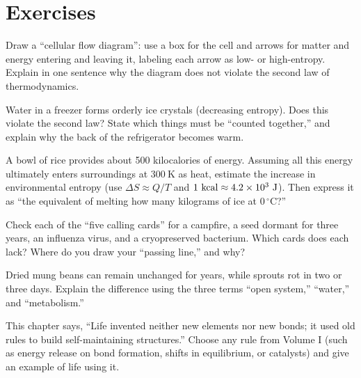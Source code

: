 \section*{Exercises}

\begin{sikaoti}
\item Draw a ``cellular flow diagram'': use a box for the cell and arrows for matter and energy entering and leaving it, labeling each arrow as low- or high-entropy. Explain in one sentence why the diagram does not violate the second law of thermodynamics.
\item Water in a freezer forms orderly ice crystals (decreasing entropy). Does this violate the second law? State which things must be ``counted together,'' and explain why the back of the refrigerator becomes warm.
\item A bowl of rice provides about 500 kilocalories of energy. Assuming all this energy ultimately enters surroundings at $300\ \mathrm{K}$ as heat, estimate the increase in environmental entropy (use $\Delta S \approx Q/T$ and $1\ \mathrm{kcal}\approx4.2\times 10^{3}\ \mathrm{J}$). Then express it as ``the equivalent of melting how many kilograms of ice at $0\,^{\circ}\mathrm{C}$?''
\item Check each of the ``five calling cards'' for a campfire, a seed dormant for three years, an influenza virus, and a cryopreserved bacterium. Which cards does each lack? Where do you draw your ``passing line,'' and why?
\item Dried mung beans can remain unchanged for years, while sprouts rot in two or three days. Explain the difference using the three terms ``open system,'' ``water,'' and ``metabolism.''
\item This chapter says, ``Life invented neither new elements nor new bonds; it used old rules to build self-maintaining structures.'' Choose any rule from Volume I (such as energy release on bond formation, shifts in equilibrium, or catalysts) and give an example of life using it.
\end{sikaoti}
